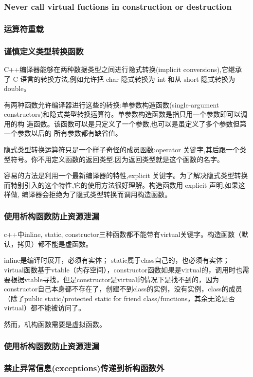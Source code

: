 \subsubsection{Never call virtual fuctions in construction or destruction}
\subsubsection{运算符重载}
\subsubsection{谨慎定义类型转换函数}
C++编译器能够在两种数据类型之间进行隐式转换(implicit conversions),它继承 了 C 语言的转换方法,例如允许把 char 隐式转换为 int 和从 short 隐式转换为 double。

有两种函数允许编译器进行这些的转换:单参数构造函数(single-argument constructors)和隐式类型转换运算符。单参数构造函数是指只用一个参数即可以调用的构 造函数。该函数可以是只定义了一个参数,也可以是虽定义了多个参数但第一个参数以后的 所有参数都有缺省值。

隐式类型转换运算符只是一个样子奇怪的成员函数:operator 关键字,其后跟一个类
型符号。你不用定义函数的返回类型,因为返回类型就是这个函数的名字。

容易的方法是利用一个最新编译器的特性,explicit 关键字。为了解决隐式类型转换 而特别引入的这个特性,它的使用方法很好理解。构造函数用 explicit 声明,如果这样做, 编译器会拒绝为了隐式类型转换而调用构造函数。

\subsubsection{使用析构函数防止资源泄漏}
c++中inline, static, constructor三种函数都不能带有virtual关键字。构造函数（默认，拷贝）都不能是虚函数。

inline是编译时展开，必须有实体；
static属于class自己的，也必须有实体；
virtual函数基于vtable（内存空间），constructor函数如果是virtual的，调用时也需要根据vtable寻找，但是constructor是virtual的情况下是找不到的，因为constructor自己本身都不存在了，创建不到class的实例，没有实例，class的成员（除了public static/protected static for friend class/functions，其余无论是否virtual）都不能被访问了。

然而，机构函数需要是虚拟函数。

\subsubsection{使用析构函数防止资源泄漏}
\subsubsection{禁止异常信息(exceptions)传递到析构函数外}
